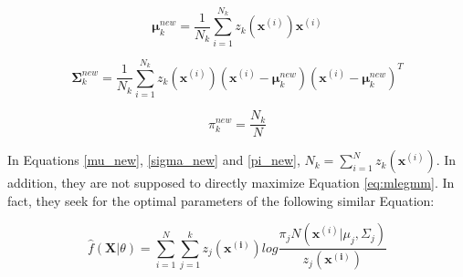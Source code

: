 \begin{equation}
    \bm{\mu}_k^{new} = \frac{1}{N_k} \sum_{i=1}^{N_k} z_k(\mathbf{x}^{(i)}) \mathbf{x}^{(i)}
\label{mu_new}
\end{equation}

\begin{equation}
    \bm{\Sigma}_k^{new} = \frac{1}{N_k} \sum_{i=1}^{N_{k}} z_k(\mathbf{x}^{(i)}) (\mathbf{x}^{(i)} - \bm{\mu}_k^{new}) (\mathbf{x}^{(i)} - \bm{\mu}_k^{new})^{T}
\label{sigma_new}
\end{equation}

\begin{equation}
    \pi_k^{new} = \frac{N_k}{N}
    \label{pi_new}
\end{equation}

\noindent In Equations \ref{mu_new}, \ref{sigma_new} and \ref{pi_new}, $N_k = \sum_{i = 1}^{N} z_k(\mathbf{x}^{(i)})$. In addition, they are not supposed to directly maximize Equation \ref{eq:mlegmm}. In fact, they seek for the optimal parameters of the following similar Equation:

\begin{equation}
     \hat{f}(\mathbf{X} | \theta) = \sum_{i = 1}^{N} \sum_{j = 1}^{k} z_{j}(\mathbf{x^{(i)}}) log \frac{\pi_{j} N(\mathbf{x}^{(i)} | \mu_j, \Sigma_j)}{z_{j}(\mathbf{x^{(i)}})}
\end{equation}






